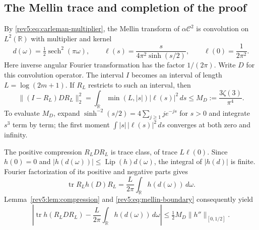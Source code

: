 \subsection{The Mellin trace and completion of the proof}
\label{rev5:subsec:mellin}

By \eqref{rev5:eq:carleman-multiplier}, the Mellin transform of
$\alpha\mathcal C^2$ is convolution on $L^2(\mathbb R)$ with multiplier
and kernel
\begin{equation}\label{rev5:eq:mellin-model}
 d(\omega)=\tfrac12\operatorname{sech}^2(\pi\omega),\qquad
 \ell(s)=\frac{s}{4\pi^2\sinh(s/2)},\qquad \ell(0)=\frac1{2\pi^2}.
\end{equation}
Here inverse angular Fourier transformation has the factor $1/(2\pi)$.
Write $D$ for this convolution operator.  The interval $I$ becomes an
interval of length $L=\log(2m+1)$.  If $R_L$ restricts to such an
interval, then
\begin{equation}\label{rev5:eq:mellin-boundary}
 \|(I-R_L)DR_L\|_2^2
 =\int_{\mathbb R}\min(L,|s|)|\ell(s)|^2\,ds
 \leq M_D:=\frac{3\zeta(3)}{\pi^4}.
\end{equation}
To evaluate $M_D$, expand $\sinh^{-2}(s/2)=4\sum_{j\geq1}je^{-js}$ for
$s>0$ and integrate $s^3$ term by term; the first moment
$\int|s|\,|\ell(s)|^2\,ds$ converges at both zero and infinity.

The positive compression $R_LDR_L$ is trace class, of trace
$L\ell(0)$.  Since $h(0)=0$ and
$|h(d(\omega))|\leq\operatorname{Lip}(h)d(\omega)$, the integral
of $|h(d)|$ is finite.  Fourier factorization of its positive and
negative parts gives
\[
 \operatorname{tr}R_Lh(D)R_L
 =\frac{L}{2\pi}\int_{\mathbb R}h(d(\omega))\,d\omega.
\]
Lemma~\ref{rev5:lem:compression} and
\eqref{rev5:eq:mellin-boundary} consequently yield
\begin{equation}\label{rev5:eq:mellin-trace}
 \left|\operatorname{tr}h(R_LDR_L)
 -\frac{L}{2\pi}\int_{\mathbb R}h(d(\omega))\,d\omega\right|
 \leq\tfrac12 M_D\|h''\|_{[0,1/2]}.
\end{equation}

